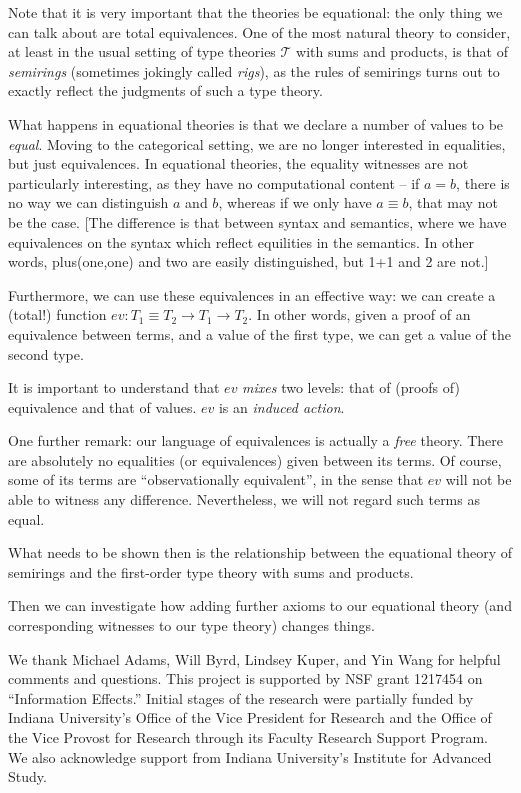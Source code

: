 \documentclass[preprint]{sigplanconf}
\begin{document}
Note that it is very important that the theories be equational: the only
thing we can talk about are total equivalences.  One of the most natural
theory to consider, at least in the usual setting of type theories
$\mathcal{T}$ with sums and products, is that of \emph{semirings} (sometimes
jokingly called \emph{rigs}), as the rules of semirings turns out to exactly
reflect the judgments of such a type theory.

What happens in equational theories is that we declare a number of values to
be \emph{equal}.  Moving to the categorical setting, we are no longer
interested in equalities, but just equivalences.  In equational theories, the
equality witnesses are not particularly interesting, as they have no
computational content -- if $a = b$, there is no way we can distinguish $a$
and $b$, whereas if we only have $a \equiv b$, that may not be the case.
[The difference is that between syntax and semantics, where we have
equivalences on the syntax which reflect equilities in the semantics.  In
other words, plus(one,one) and two are easily distinguished, but 1+1 and 2
are not.]

Furthermore, we can use these equivalences in an effective way: we can create
a (total!) function $ev : T_1 \equiv T_2 \rightarrow T_1 \rightarrow T_2$.
In other words, given a proof of an equivalence between terms, and a value of
the first type, we can get a value of the second type.

It is important to understand that $ev$ \emph{mixes} two levels: that of
(proofs of) equivalence and that of values.  $ev$ is an \emph{induced
  action}.

One further remark: our language of equivalences is actually a \emph{free}
theory.  There are absolutely no equalities (or equivalences) given between
its terms.  Of course, some of its terms are ``observationally equivalent'',
in the sense that $ev$ will not be able to witness any difference.
Nevertheless, we will not regard such terms as equal.

What needs to be shown then is the relationship between the equational theory
of semirings and the first-order type theory with sums and products.

Then we can investigate how adding further axioms to our equational theory
(and corresponding witnesses to our type theory) changes things.

\acks We thank Michael Adams, Will Byrd, Lindsey Kuper, and Yin Wang for
helpful comments and questions. This project is supported by NSF grant
1217454 on ``Information Effects.'' Initial stages of the research were
partially funded by Indiana University's Office of the Vice President for
Research and the Office of the Vice Provost for Research through its Faculty
Research Support Program.  We also acknowledge support from Indiana
University's Institute for Advanced Study.

\begin{small}


\end{small}
\end{document}
